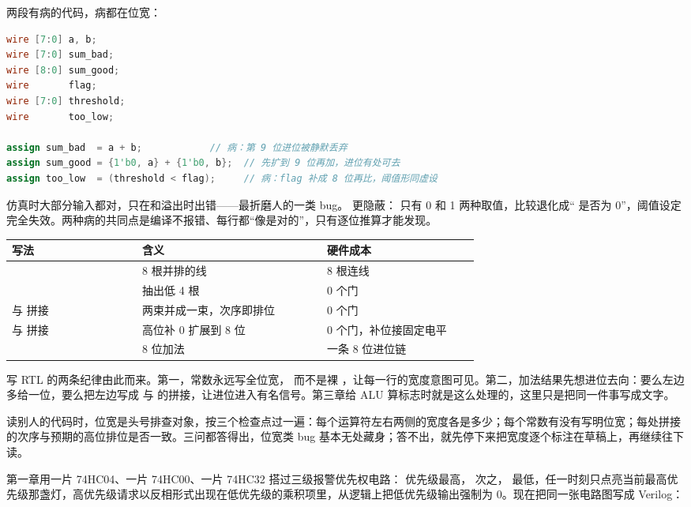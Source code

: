 两段有病的代码，病都在位宽：

\begin{lstlisting}[language=Verilog]
wire [7:0] a, b;
wire [7:0] sum_bad;
wire [8:0] sum_good;
wire       flag;
wire [7:0] threshold;
wire       too_low;

assign sum_bad  = a + b;            // 病：第 9 位进位被静默丢弃
assign sum_good = {1'b0, a} + {1'b0, b};  // 先扩到 9 位再加，进位有处可去
assign too_low  = (threshold < flag);     // 病：flag 补成 8 位再比，阈值形同虚设
\end{lstlisting}

 仿真时大部分输入都对，只在和溢出时出错——最折磨人的一类 bug。 更隐蔽： 只有 0 和 1 两种取值，比较退化成“ 是否为 0”，阈值设定完全失效。两种病的共同点是编译不报错、每行都“像是对的”，只有逐位推算才能发现。

\begin{longtable}{L{0.24\linewidth}L{0.34\linewidth}L{0.28\linewidth}}
\toprule
写法 & 含义 & 硬件成本 \\
\midrule
{} & 8 根并排的线 & 8 根连线 \\
 & 抽出低 4 根 & 0 个门 \\
 与  拼接 & 两束并成一束，次序即排位 & 0 个门 \\
 与  拼接 & 高位补 0 扩展到 8 位 & 0 个门，补位接固定电平 \\
 & 8 位加法 & 一条 8 位进位链 \\
\bottomrule
\end{longtable}

写 RTL 的两条纪律由此而来。第一，常数永远写全位宽， 而不是裸 ，让每一行的宽度意图可见。第二，加法结果先想进位去向：要么左边多给一位，要么把左边写成  与  的拼接，让进位进入有名信号。第三章给 ALU 算标志时就是这么处理的，这里只是把同一件事写成文字。

读别人的代码时，位宽是头号排查对象，按三个检查点过一遍：每个运算符左右两侧的宽度各是多少；每个常数有没有写明位宽；每处拼接的次序与预期的高位排位是否一致。三问都答得出，位宽类 bug 基本无处藏身；答不出，就先停下来把宽度逐个标注在草稿上，再继续往下读。

第一章用一片 74HC04、一片 74HC00、一片 74HC32 搭过三级报警优先权电路： 优先级最高， 次之， 最低，任一时刻只点亮当前最高优先级那盏灯，高优先级请求以反相形式出现在低优先级的乘积项里，从逻辑上把低优先级输出强制为 0。现在把同一张电路图写成 Verilog：

